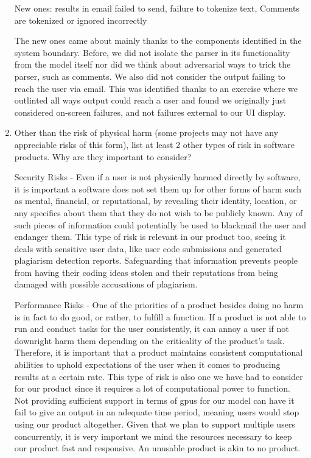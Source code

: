 \documentclass{article}
\begin{document}
\begin{enumerate}
    New ones: results in email failed to send, failure to tokenize text, 
    Comments are tokenized or ignored incorrectly

    The new ones came about mainly thanks to the components identified in the 
    system boundary. Before, we did not isolate the parser in its functionality 
    from the model itself nor did we think about adversarial ways to trick the 
    parser, such as comments. We also did not consider the output failing to 
    reach the user via email. This was identified thanks to an exercise where we 
    outlinted all ways output could reach a user and found we originally just
    considered on-screen failures, and not failures external to our UI display.
    

    \item Other than the risk of physical harm (some projects may not have any
    appreciable risks of this form), list at least 2 other types of risk in
    software products. Why are they important to consider?

    Security Risks - Even if a user is not physically harmed directly by software,
    it is important a software does not set them up for other forms of harm such
    as mental, financial, or reputational, by revealing their identity, location, or
    any specifics about them that they do not wish to be publicly known. Any of 
    such pieces of information could potentially be used to blackmail the user 
    and endanger them. This type of risk is relevant in our product too, seeing 
    it deals with sensitive user data, like user code submissions and generated 
    plagiarism detection reports. Safeguarding that information prevents people 
    from having their coding ideas stolen and their reputations from being 
    damaged with possible accusations of plagiarism.

    Performance Risks - One of the priorities of a product besides doing no 
    harm is in fact to do good, or rather, to fulfill a function. If a product 
    is not able to run and conduct tasks for the user consistently, it can 
    annoy a user if not downright harm them depending on the criticality of the 
    product's task. Therefore, it is important that a product maintains 
    consistent computational abilities to uphold expectations of the user when
    it comes to producing results at a certain rate. This type of risk is also
    one we have had to consider for our product since it requires a lot of 
    computational power to function. Not providing sufficient support in terms of
    gpus for our model can have it fail to give an output in an adequate time
    period, meaning users would stop using our product altogether. Given that we 
    plan to support multiple users concurrently, it is very important we mind the 
    resources necessary to keep our product fast and responsive. An unusable 
    product is akin to no product.


\end{enumerate}
\end{document}
